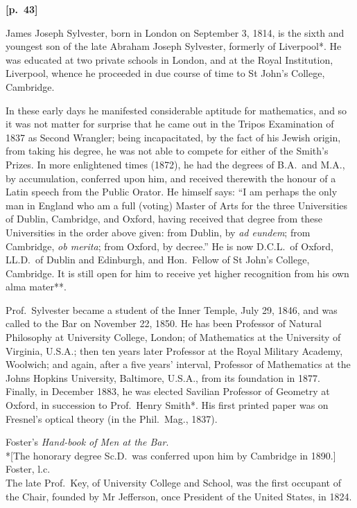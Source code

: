 \documentclass[11pt,a4paper]{article}
\theoremstyle{plain}
\begin{document}
\vspace{0.5em}
\noindent\textbf{[p.\ 43]}

James Joseph Sylvester, born in London on September 3, 1814, is the sixth and youngest son of the late Abraham Joseph Sylvester, formerly of Liverpool*. He was educated at two private schools in London, and at the Royal Institution, Liverpool, whence he proceeded in due course of time to St John's College, Cambridge.

In these early days he manifested considerable aptitude for mathematics, and so it was not matter for surprise that he came out in the Tripos Examination of 1837 as Second Wrangler; being incapacitated, by the fact of his Jewish origin, from taking his degree, he was not able to compete for either of the Smith's Prizes. In more enlightened times (1872), he had the degrees of B.A.\ and M.A., by accumulation, conferred upon him, and received therewith the honour of a Latin speech from the Public Orator. He himself says: ``I am perhaps the only man in England who am a full (voting) Master of Arts for the three Universities of Dublin, Cambridge, and Oxford, having received that degree from these Universities in the order above given: from Dublin, by \textit{ad eundem}; from Cambridge, \textit{ob merita}; from Oxford, by decree.'' He is now D.C.L.\ of Oxford, LL.D.\ of Dublin and Edinburgh, and Hon.\ Fellow of St John's College, Cambridge. It is still open for him to receive yet higher recognition from his own alma mater**.

Prof.\ Sylvester became a student of the Inner Temple, July 29, 1846, and was called to the Bar on November 22, 1850\dag. He has been Professor of Natural Philosophy at University College, London; of Mathematics at the University of Virginia, U.S.A.\ddag; then ten years later Professor at the Royal Military Academy, Woolwich; and again, after a five years' interval, Professor of Mathematics at the Johns Hopkins University, Baltimore, U.S.A., from its foundation in 1877. Finally, in December 1883, he was elected Savilian Professor of Geometry at Oxford, in succession to Prof.\ Henry Smith*. His first printed paper was on Fresnel's optical theory (in the Phil.\ Mag., 1837).

\vspace{0.3em}
\noindent * Foster's \textit{Hand-book of Men at the Bar}.\\
\noindent **[The honorary degree Sc.D.\ was conferred upon him by Cambridge in 1890.]\\
\noindent \dag Foster, l.c.\\
\noindent \ddag The late Prof.\ Key, of University College and School, was the first occupant of the Chair, founded by Mr Jefferson, once President of the United States, in 1824.
\end{document}
